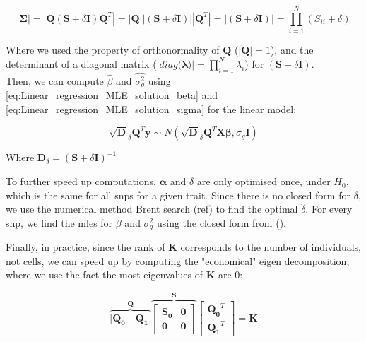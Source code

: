 \begin{equation}\label{eq:fast_lmm_Sigma_determinant}
    |\boldsymbol{\Sigma}| = |\mathbf{Q} (\mathbf{S} + \delta\mathbf{I})\mathbf{Q}^T|= |\mathbf{Q}||(\mathbf{S} + \delta\mathbf{I})||\mathbf{Q}^T| = |(\mathbf{S} + \delta\mathbf{I})| =  \prod_{i=1}^{N} (S_{ii} + \delta)
\end{equation}

Where we used the property of orthonormality of $\mathbf{Q}$ ($|\mathbf{Q}| = 1$), and the determinant of a diagonal matrix ($|diag(\boldsymbol{\lambda)}| = \prod_{i=1}^{N} \lambda_i$) for $(\mathbf{S} + \delta\mathbf{I})$.\\

Then, we can compute $\hat{\beta}$ and  $\hat{\sigma_g^2}$ using \eqref{eq:Linear_regression_MLE_solution_beta} and \eqref{eq:Linear_regression_MLE_solution_sigma} for the linear model:

\begin{equation}
    \sqrt{\mathbf{D}}_{\delta}\mathbf{Q}^{T}\mathbf{y} \sim N(\sqrt{\mathbf{D}}_{\delta}\mathbf{Q}^{T}\mathbf{X}\boldsymbol{\beta}, \sigma_g\mathbf{I})
\end{equation}

Where $ \mathbf{D}_{\delta} = (\mathbf{S} + \delta\mathbf{I})^{-1}$

To further speed up computations, $\boldsymbol{\alpha}$ and $\delta$ are only optimised once, under $H_0$, which is the same for all \gls{snps} for a given trait.
Since there is no closed form for $\delta$, we use the numerical method Brent search (ref) to find the optimal $\hat{\delta}$.
For every snp, we find the \gls{mle}s for $\beta$ and $\sigma^2_g$ using the closed form from ().

Finally, in practice, since the rank of $\mathbf{K}$ corresponds to the number of individuals, not cells, we can speed up by computing the "economical" eigen decomposition, where we use the fact the most eigenvalues of $\mathbf{K}$ are 0:

\begin{equation}\label{eq:economic_eigen_decomposition}
    \overbrace{[\mathbf{Q_0} \quad \mathbf{Q_1]}}^{\mathbf{Q}}
            \overbrace{\left[\begin{array}{cc}
                \mathbf{S_0} & \mathbf{0}\\
                        \mathbf{0} & \mathbf{0}
            \end{array}\right]}^{\mathbf{S}}
        \left[\begin{array}{c}
            \mathbf{Q_0}^T \\
            \mathbf{Q_1}^T
        \end{array}\right] = \mathbf{K}
\end{equation}

